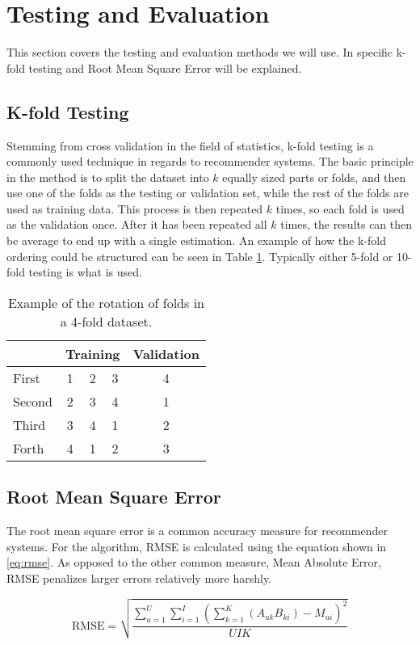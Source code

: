 \section{Testing and Evaluation}
This section covers the testing and evaluation methods we will use. In specific k-fold testing and Root Mean Square Error will be explained.

\subsection{K-fold Testing}
Stemming from cross validation in the field of statistics, k-fold testing is a commonly used technique in regards to recommender systems. The basic principle in the method is to split the dataset into $k$ equally sized parts or folds, and then use one of the folds as the testing or validation set, while the rest of the folds are used as training data. This process is then repeated $k$ times, so each fold is used as the validation once. After it has been repeated all $k$ times, the results can then be average to end up with a single estimation. An example of how the k-fold ordering could be structured can be seen in Table \ref{tbl:bg_k-fold}. Typically either 5-fold or 10-fold testing is what is used.

\begin{table}[H]
	\centering
	\begin{tabular}{|l|c|c|c|c|}
		\hline
		& \multicolumn{3}{l|}{Training} & \multicolumn{1}{l|}{Validation} \\ \hline
		First  & 1        & 2        & 3       & 4                               \\ \hline
		Second & 2        & 3        & 4       & 1                               \\ \hline
		Third  & 3        & 4        & 1       & 2                               \\ \hline
		Forth  & 4        & 1        & 2       & 3                               \\ \hline
	\end{tabular}
	\caption{Example of the rotation of folds in a 4-fold dataset.}
	\label{tbl:bg_k-fold}
\end{table}

\subsection{Root Mean Square Error}
The root mean square error is a common accuracy measure for recommender systems. For the algorithm, RMSE is calculated using the equation shown in \ref{eq:rmse}. As opposed to the other common measure, Mean Absolute Error, RMSE penalizes larger errors relatively more harshly.

\begin{equation}\label{eq:rmse}
	\text{RMSE} = \sqrt{\frac{\sum_{u=1}^{U}\sum_{i=1}^{I}(\sum_{k=1}^{K}(A_{uk} B_{ki}) - M_{ui})^2}{UIK}}
\end{equation}